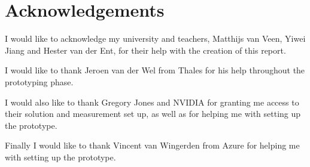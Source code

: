 \section{Acknowledgements}
I would like to acknowledge my university and teachers, Matthijs van Veen, Yiwei Jiang and Hester van der Ent, for their help with the creation of this report.

I would like to thank Jeroen van der Wel from Thales for his help throughout the prototyping phase.

I would also like to thank Gregory Jones and NVIDIA for granting me access to their solution and measurement set up, as well as for helping me with setting up the prototype.

Finally I would like to thank Vincent van Wingerden from Azure for helping me with setting up the prototype.